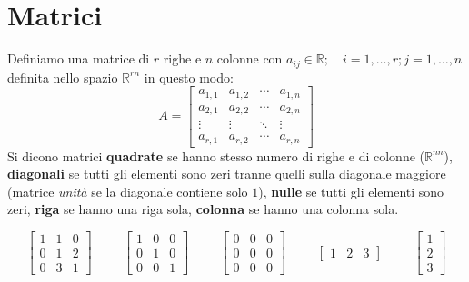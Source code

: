 \documentclass[x11names]{article}
\begin{document}

\newpage
\section{Matrici}

Definiamo una matrice di $r$ righe e $n$ colonne con $a_{ij} \in \mathbb{R}; \quad i = 1,\dots,r; j = 1,\dots,n$ definita nello spazio $\mathbb{R}^{rn}$ in questo modo:
$$
A=
\begin{bmatrix}a_{1,1}&a_{1,2}&\cdots &a_{1,n}\\a_{2,1}&a_{2,2}&\cdots &a_{2,n}\\ \vdots &\vdots &\ddots &\vdots \\a_{r,1}&a_{r,2}&\cdots &a_{r,n}\end{bmatrix}
$$
Si dicono matrici \textbf{quadrate} se hanno stesso numero di righe e di colonne ($\mathbb{R}^{nn}$), \textbf{diagonali} se tutti gli elementi sono zeri tranne quelli sulla diagonale maggiore (matrice \textit{unità} se la diagonale contiene solo $1$), \textbf{nulle} se tutti gli elementi sono zeri, \textbf{riga} se hanno una riga sola, \textbf{colonna} se hanno una colonna sola.

$$
\begin{bmatrix}1 & 1 & 0 \\ 0 & 1 & 2 \\ 0 & 3 & 1\end{bmatrix}
\hspace{1cm}
\begin{bmatrix}1 & 0 & 0\\0 & 1 & 0\\ 0 & 0 & 1\end{bmatrix}
\hspace{1cm}
\begin{bmatrix}0 & 0 & 0\\0 & 0 & 0\\ 0 & 0 & 0\end{bmatrix}
\hspace{1cm}
\begin{bmatrix}1 & 2 & 3\end{bmatrix}
\hspace{1cm}
\begin{bmatrix}1\\ 2 \\ 3 \end{bmatrix}
$$
\end{document}
